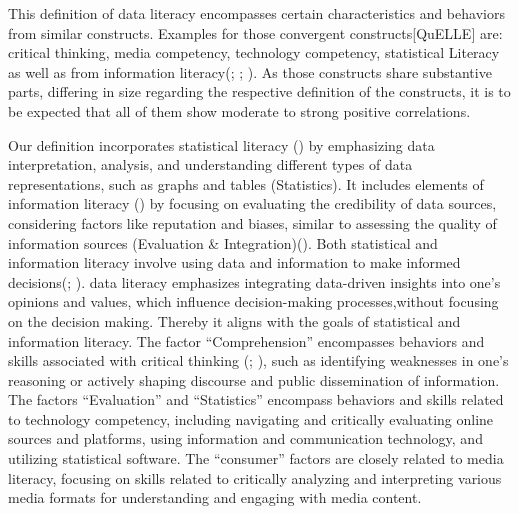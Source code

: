 \documentclass[
  12pt,
  a4paper,
  twoside]{article}
\begin{document}
This definition of data literacy encompasses certain characteristics and behaviors from similar constructs. Examples for those convergent constructs{[}QuELLE{]} are: critical thinking, media competency, technology competency, statistical Literacy as well as from information literacy(; ; ). As those constructs share substantive parts, differing in size regarding the respective definition of the constructs, it is to be expected that all of them show moderate to strong positive correlations.

Our definition incorporates statistical literacy () by emphasizing data interpretation, analysis, and understanding different types of data representations, such as graphs and tables (Statistics). It includes elements of information literacy () by focusing on evaluating the credibility of data sources, considering factors like reputation and biases, similar to assessing the quality of information sources (Evaluation \& Integration)(). Both statistical and information literacy involve using data and information to make informed decisions(; ). data literacy emphasizes integrating data-driven insights into one's opinions and values, which influence decision-making processes,without focusing on the decision making. Thereby it aligns with the goals of statistical and information literacy. The factor ``Comprehension'' encompasses behaviors and skills associated with critical thinking (; ), such as identifying weaknesses in one's reasoning or actively shaping discourse and public dissemination of information. The factors ``Evaluation'' and ``Statistics'' encompass behaviors and skills related to technology competency, including navigating and critically evaluating online sources and platforms, using information and communication technology, and utilizing statistical software. The ``consumer'' factors are closely related to media literacy, focusing on skills related to critically analyzing and interpreting various media formats for understanding and engaging with media content.\\
\end{document}
